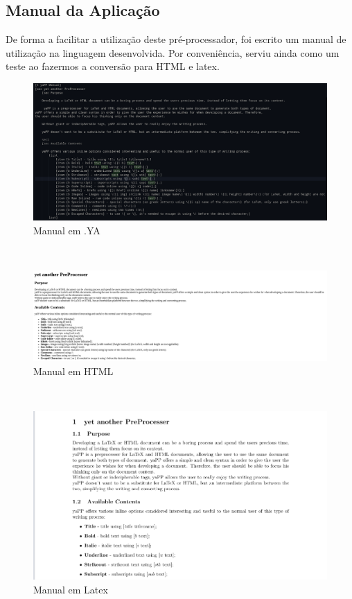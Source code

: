 \documentclass{article}
\begin{document}
 \subsection{Manual da Aplicação}
De forma a facilitar a utilização deste pré-processador, foi escrito um manual de utilização na linguagem desenvolvida. Por conveniência, serviu ainda como um teste ao fazermos a conversão para HTML e latex.\\
 
\begin{figure}[!ht]
\centering
\includegraphics[width=\textwidth]{images/manualYA.png}
\caption{Manual em .YA}
\end{figure}
\\
 
\begin{figure}[!ht]
\centering
\includegraphics[width=\textwidth]{images/manualHTML.png}
\caption{Manual em HTML}
\end{figure}
\\
 
\begin{figure}[!ht]
\centering
\includegraphics[width=\textwidth]{images/manualTEX.png}
\caption{Manual em Latex}
\end{figure}
 \clearpage
\end{document}
